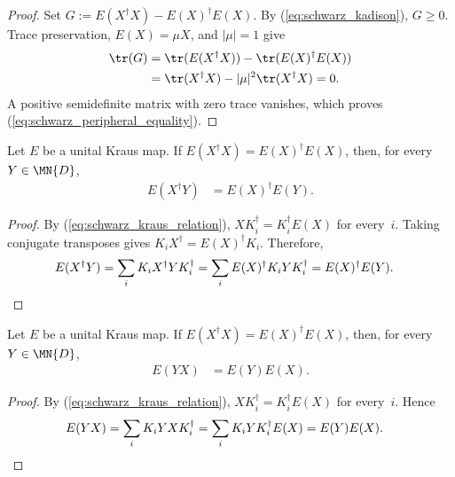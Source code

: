 \begin{proof}
    \leanok
    Set $G:=E(X^\dagger X)-E(X)^\dagger E(X)$. By
    (\ref{eq:schwarz_kadison}), $G\geq0$. Trace preservation,
    $E(X)=\mu X$, and $|\mu|=1$ give
    \begin{align}
        \tr(G)
        &= \tr(E(X^\dagger X))-\tr(E(X)^\dagger E(X))
        \notag\\
        &= \tr(X^\dagger X)-|\mu|^2\tr(X^\dagger X)
        =0.
        \notag
    \end{align}
    A positive semidefinite matrix with zero trace vanishes, which proves
    (\ref{eq:schwarz_peripheral_equality}).
\end{proof}

\begin{theorem}\label{thm:left_multiplicative_identity}
    \leanok
    Let $E$ be a unital Kraus map.
    If $E(X^\dagger X) = E(X)^\dagger E(X)$, then, for every
    $Y \in \MN{D}$,
    \begin{align}
        E(X^\dagger Y)
        &= E(X)^\dagger E(Y).
        \label{eq:schwarz_left_multiplicative}
    \end{align}
\end{theorem}

\begin{proof}
    \leanok
    By (\ref{eq:schwarz_kraus_relation}),
    $X K_i^\dagger=K_i^\dagger E(X)$ for every~$i$. Taking conjugate
    transposes gives $K_iX^\dagger=E(X)^\dagger K_i$. Therefore,
    \begin{align}
        E(X^\dagger Y)
        &= \sum_i K_iX^\dagger YK_i^\dagger
        = \sum_i E(X)^\dagger K_iYK_i^\dagger
        = E(X)^\dagger E(Y).
        \notag
    \end{align}
\end{proof}

\begin{theorem}
    \label{thm:right_multiplicative_identity}
    \leanok
    Let $E$ be a unital Kraus map.
    If $E(X^\dagger X) = E(X)^\dagger E(X)$, then, for every
    $Y \in \MN{D}$,
    \begin{align}
        E(YX)
        &= E(Y)E(X).
        \label{eq:schwarz_right_multiplicative}
    \end{align}
\end{theorem}

\begin{proof}
    \leanok
    By (\ref{eq:schwarz_kraus_relation}),
    $X K_i^\dagger=K_i^\dagger E(X)$ for every~$i$. Hence
    \begin{align}
        E(YX)
        &= \sum_i K_iYXK_i^\dagger
        = \sum_i K_iYK_i^\dagger E(X)
        = E(Y)E(X).
        \notag
    \end{align}
\end{proof}

